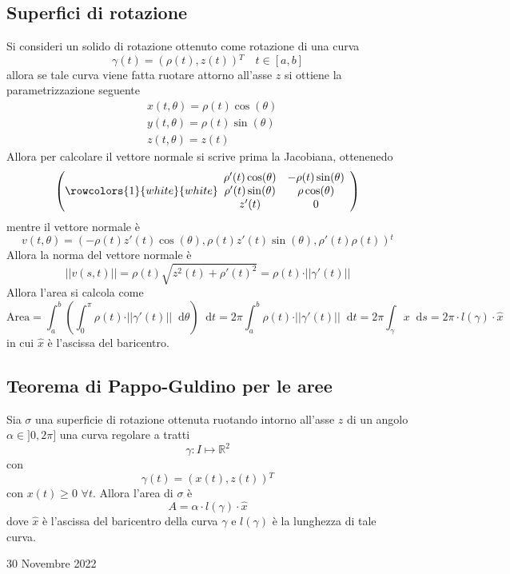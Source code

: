 \documentclass[a4paper]{extarticle}
\newcommand*\dif{\mathop{}\!\mathrm{d}}
\begin{document}
\subsection{Superfici di rotazione}
Si consideri un solido di rotazione ottenuto come rotazione di una curva
\[\gamma(t)=(\rho(t),z(t)){^T} \hspace{1em} t \in [a,b]\]
allora se tale curva viene fatta ruotare attorno all'asse $z$ si ottiene la parametrizzazione seguente
\begin{align*}
    &x(t,\theta)=\rho(t)\cos(\theta)\\
    &y(t,\theta)=\rho(t)\sin(\theta)\\
    &z(t,\theta)=z(t)
\end{align*}
Allora per calcolare il vettore normale si scrive prima la Jacobiana, ottenenedo
\[
    \left(
        \rowcolors{1}{white}{white}
        \begin{array}{cc}
            \rho'(t)\cos(\theta) & -\rho(t)\sin(\theta)\\
            \rho'(t)\sin(\theta) & \rho\cos(\theta)\\
            z'(t) & 0\\
        \end{array}
    \right)
\]
mentre il vettore normale è
\[v(t,\theta)=(-\rho(t) z'(t) \cos(\theta), \rho(t) z'(t) \sin(\theta), \rho'(t) \rho(t)){^t}\]
Allora la norma del vettore normale è
\[\vert \vert v(s,t) \vert \vert = \rho(t) \sqrt{z^2(t) + \rho'(t)^2} = \rho(t) \cdot \vert \vert \gamma'(t) \vert \vert\]
Allora l'area si calcola come
\[\text{Area} = \int_a^b \left(\int_0^\pi \rho(t) \cdot \vert \vert \gamma'(t) \vert \vert \dif \theta\right) \dif t = 2\pi \int_a^b \rho(t) \cdot \vert \vert \gamma'(t) \vert \vert \dif t = 2 \pi \int_\gamma x \dif s = 2\pi \cdot l(\gamma) \cdot \hat x\]
in cui $\hat x$ è l'ascissa del baricentro.

\vspace{1em}
\noindent
\subsection{Teorema di Pappo-Guldino per le aree}
Sia $\sigma$ una superficie di rotazione ottenuta ruotando intorno all'asse $z$ di un angolo $\alpha \in ]0,2\pi]$ una curva regolare a tratti
\[\gamma : I \longmapsto \mathbb{R}^2\]
con
\[\gamma(t)=(x(t),z(t)){^T}\]
con $x(t) \geq 0$ $\forall t$. Allora l'area di $\sigma$ è
\[A = \alpha \cdot l(\gamma) \cdot \hat x\]
dove $\hat x$  è l'ascissa del baricentro della curva $\gamma$ e $l(\gamma)$ è la lunghezza di tale curva.

\newpage
\noindent
\begin{center}
    30 Novembre 2022
\end{center}
\end{document}
